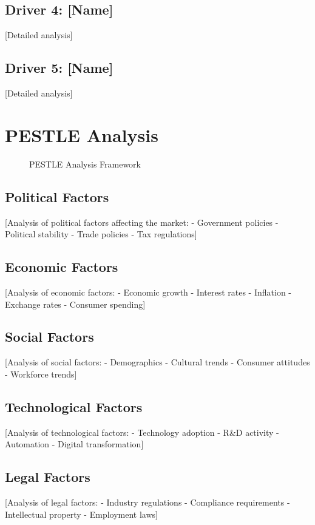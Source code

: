\documentclass[11pt,letterpaper]{report}
\begin{document}
\subsection{Driver 4: [Name]}
[Detailed analysis]

\subsection{Driver 5: [Name]}
[Detailed analysis]

\section{PESTLE Analysis}


\begin{figure}[htbp]
\centering
\caption{PESTLE Analysis Framework}
\label{fig:pestle}
\end{figure}

\subsection{Political Factors}
[Analysis of political factors affecting the market:
- Government policies
- Political stability
- Trade policies
- Tax regulations]

\subsection{Economic Factors}
[Analysis of economic factors:
- Economic growth
- Interest rates
- Inflation
- Exchange rates
- Consumer spending]

\subsection{Social Factors}
[Analysis of social factors:
- Demographics
- Cultural trends
- Consumer attitudes
- Workforce trends]

\subsection{Technological Factors}
[Analysis of technological factors:
- Technology adoption
- R\&D activity
- Automation
- Digital transformation]

\subsection{Legal Factors}
[Analysis of legal factors:
- Industry regulations
- Compliance requirements
- Intellectual property
- Employment laws]
\end{document}

